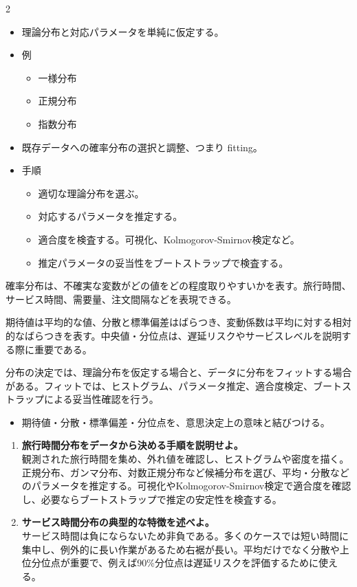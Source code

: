 \clearpage
{}
\begin{multicols}{2}\footnotesize\raggedcolumns
{}
\begin{itemize}
\item 理論分布と対応パラメータを単純に仮定する。
\item 例
\begin{itemize}
\item 一様分布
\item 正規分布
\item 指数分布
\end{itemize}
\item 既存データへの確率分布の選択と調整、つまり fitting。
\item 手順
\begin{itemize}
\item 適切な理論分布を選ぶ。
\item 対応するパラメータを推定する。
\item 適合度を検査する。可視化、Kolmogorov-Smirnov検定など。
\item 推定パラメータの妥当性をブートストラップで検査する。
\end{itemize}
\end{itemize}
確率分布は、不確実な変数がどの値をどの程度取りやすいかを表す。旅行時間、サービス時間、需要量、注文間隔などを表現できる。\par

期待値は平均的な値、分散と標準偏差はばらつき、変動係数は平均に対する相対的なばらつきを表す。中央値・分位点は、遅延リスクやサービスレベルを説明する際に重要である。\par

分布の決定では、理論分布を仮定する場合と、データに分布をフィットする場合がある。フィットでは、ヒストグラム、パラメータ推定、適合度検定、ブートストラップによる妥当性確認を行う。\par
{}
\begin{itemize}
\item 期待値・分散・標準偏差・分位点を、意思決定上の意味と結びつける。
\end{itemize}
\begin{enumerate}
\item \textbf{旅行時間分布をデータから決める手順を説明せよ。}\\観測された旅行時間を集め、外れ値を確認し、ヒストグラムや密度を描く。正規分布、ガンマ分布、対数正規分布など候補分布を選び、平均・分散などのパラメータを推定する。可視化やKolmogorov-Smirnov検定で適合度を確認し、必要ならブートストラップで推定の安定性を検査する。
\item \textbf{サービス時間分布の典型的な特徴を述べよ。}\\サービス時間は負にならないため非負である。多くのケースでは短い時間に集中し、例外的に長い作業があるため右裾が長い。平均だけでなく分散や上位分位点が重要で、例えば90\%分位点は遅延リスクを評価するために使える。
\end{enumerate}
\end{multicols}


